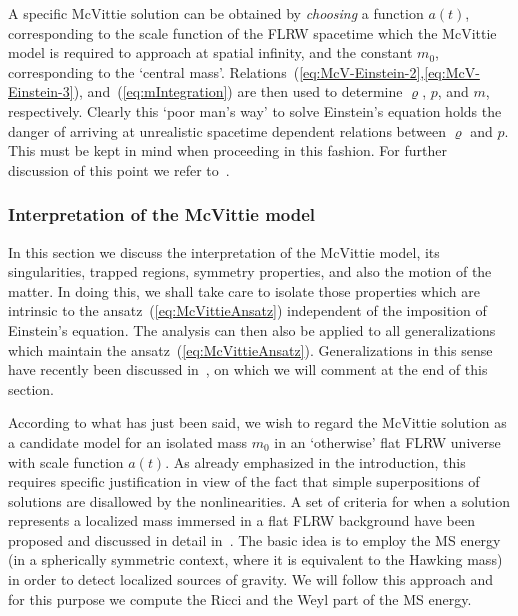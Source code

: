 \documentclass
[rmp,aps,twocolumn,showpacs,preprintnumbers,amsmath,amssymb]{revtex4}
\theoremstyle{plain}
\theoremstyle{definition}
\theoremstyle{remark}
\begin{document}
A specific McVittie solution can be obtained by \emph{choosing} a function 
$a(t)$, corresponding to the scale function of the FLRW spacetime which 
the McVittie model is required to approach at spatial infinity, and the 
constant $m_0$, corresponding to the `central 
mass'. Relations~(\ref{eq:McV-Einstein-2},\ref{eq:McV-Einstein-3}), 
and~(\ref{eq:mIntegration}) are then used to determine $\varrho$, 
$p$, and $m$, respectively. Clearly this `poor man's way' to solve 
Einstein's equation holds the danger of arriving at unrealistic 
spacetime dependent relations between $\varrho$ and $p$. This must 
be kept in mind when proceeding in this fashion. For further 
discussion of this point we refer to~\cite{Nolan:1998,Nolan:1999a}. 


\subsubsection{Interpretation of the McVittie model}
\label{sec:McVittieInterpretation}
%
In this section we discuss the interpretation of the McVittie model, its 
singularities, trapped regions, symmetry properties, and also the motion 
of the matter. In doing this, we shall take care to isolate those properties 
which are intrinsic to the ansatz~(\ref{eq:McVittieAnsatz}) independent of 
the imposition of Einstein's equation. The analysis can then also be applied 
to all generalizations which maintain the ansatz~(\ref{eq:McVittieAnsatz}). 
Generalizations in this sense have recently been discussed 
in~\cite{Faraoni.Jacques:2007}, on which we will comment at the end 
of this section. 

According to what has just been said, we wish to regard the McVittie 
solution as a candidate model for an isolated mass $m_0$ in an `otherwise' 
flat FLRW universe with scale function $a(t)$. As already emphasized 
in the introduction, this requires specific justification in view of 
the fact that simple superpositions of solutions are disallowed by the 
nonlinearities. A set of criteria for when a solution represents a 
localized mass immersed in a flat FLRW background have been proposed 
and discussed in detail in~\cite{Nolan:1998}. The basic idea is to 
employ the MS energy (in a spherically symmetric context,
where it is equivalent to the Hawking mass) in order to detect 
localized sources of gravity. We will follow this approach and for 
this purpose we compute the Ricci and the Weyl part of the MS energy. 
\end{document}
